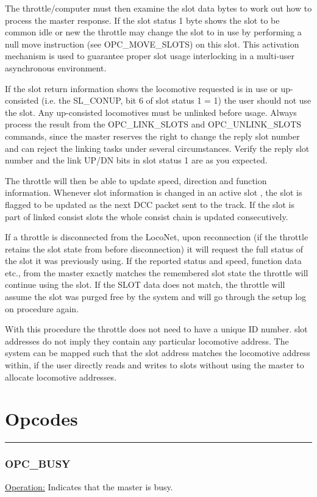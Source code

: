 The throttle/computer must then examine the slot data bytes to work out how to process the master response. If the slot status 1 byte shows the slot to be common idle or new the throttle may change the slot to in use by performing a null move instruction (see OPC\_MOVE\_SLOTS) on this slot. This activation mechanism is used to guarantee proper slot usage interlocking in a multi-user asynchronous environment.

If the slot return information shows the locomotive requested is in use or up-consisted (i.e. the SL\_CONUP, bit 6 of slot status 1 = 1) the user should not use the slot. Any up-consisted locomotives must be unlinked before usage. Always process the result from the OPC\_LINK\_SLOTS and OPC\_UNLINK\_SLOTS commands, since the master reserves the right to change the reply slot number and can reject the linking tasks under several circumstances. Verify the reply slot number and the link UP/DN bits in slot status 1 are as you expected.

The throttle will then be able to update speed, direction and function information. Whenever slot information is changed in an active slot , the slot is flagged to be updated as the next DCC packet sent to the track. If the slot is part of linked consist slots the whole consist chain is updated consecutively.

If a throttle is disconnected from the LocoNet, upon reconnection (if the throttle retains the slot state from before disconnection) it will request the full status of the slot it was previously using. If the reported status and speed, function data etc., from the master exactly matches the remembered slot state the throttle will continue using the slot. If the SLOT data does not match, the throttle will assume the slot was purged free by the system and will go through the setup log on procedure again.

With this procedure the throttle does not need to have a unique ID number. slot addresses do not imply they contain any particular locomotive address. The system can be mapped such that the slot address matches the locomotive address within, if the user directly reads and writes to slots without using the master to allocate locomotive addresses.

\section{Opcodes}

\rule{15.1cm}{0.4pt}
\subsubsection{OPC\_BUSY}
\underline{Operation:} Indicates that the master is busy.

